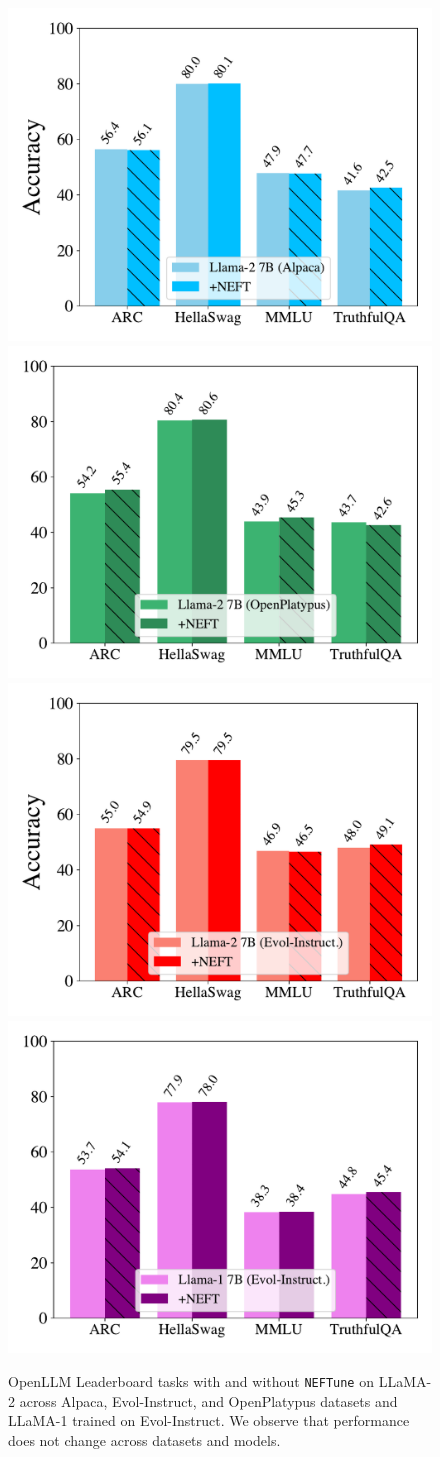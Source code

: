\documentclass{article} %
\newcommand{\neftune}{\texttt{NEFTune}}
\newcommand{\llama}{LLaMA}
\begin{document}
\begin{figure}
    \centering
    \includegraphics[width=0.44\linewidth,trim={0cm 0.6cm 0cm 0.5cm},clip]{figures/OpenLLM_Leaderboard_Llama_2_7B_Alpaca.pdf}
    \includegraphics[width=0.44\linewidth,trim={0cm 0.6cm 0cm 0.5cm},clip]{figures/OpenLLM_Leaderboard_Llama_2_7B_OpenPlatypus.pdf}
    \includegraphics[width=0.44\linewidth,trim={0cm 0.6cm 0cm 0.5cm},clip]{figures/OpenLLM_Leaderboard_Llama_2_7B_Evol_Instruct.pdf}
    \includegraphics[width=0.44\linewidth,trim={0cm 0.6cm 0cm 0.5cm},clip]{figures/OpenLLM_Leaderboard_Llama_1_7B_Evol_Instruct.pdf}
    \caption{OpenLLM Leaderboard tasks with and without \neftune{} on \llama{}-2 across Alpaca, Evol-Instruct, and OpenPlatypus datasets and \llama{}-1 trained on Evol-Instruct. We observe that performance does not change across datasets and models.}
    \label{fig:OpenLLM_leaderboard_performance}
\end{figure}
\end{document}
